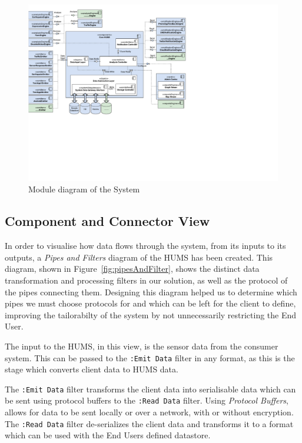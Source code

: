 \documentclass[10pt,a4paper]{article}
\begin{document}
\begin{figure}
  \centering
  \includegraphics[width=\textwidth]{images/component.pdf}
  \caption{Module diagram of the System}
  \label{fig:modules}
\end{figure}

\subsection{Component and Connector View}

In order to visualise how data flows through the system, from its inputs to its outputs, a \emph{Pipes and Filters} diagram of the HUMS has been created. This diagram, shown in Figure~\ref{fig:pipesAndFilter}, shows the distinct data transformation and processing filters in our solution, as well as the protocol of the pipes connecting them. Designing this diagram helped us to determine which pipes we must choose protocols for and which can be left for the client to define, improving the tailorabilty of the system by not unnecessarily restricting the End User.

The input to the HUMS, in this view, is the sensor data from the consumer system. This can be passed to the \texttt{:Emit Data} filter in any format, as this is the stage which converts client data to HUMS data. 

The \texttt{:Emit Data} filter transforms the client data into serialisable data which can be sent using protocol buffers to the \texttt{:Read Data} filter. Using \emph{Protocol Buffers}, allows for data to be sent locally or over a network, with or without encryption. 
The \texttt{:Read Data} filter de-serializes the client data and transforms it to a format which can be used with the End Users defined datastore. 
\end{document}
